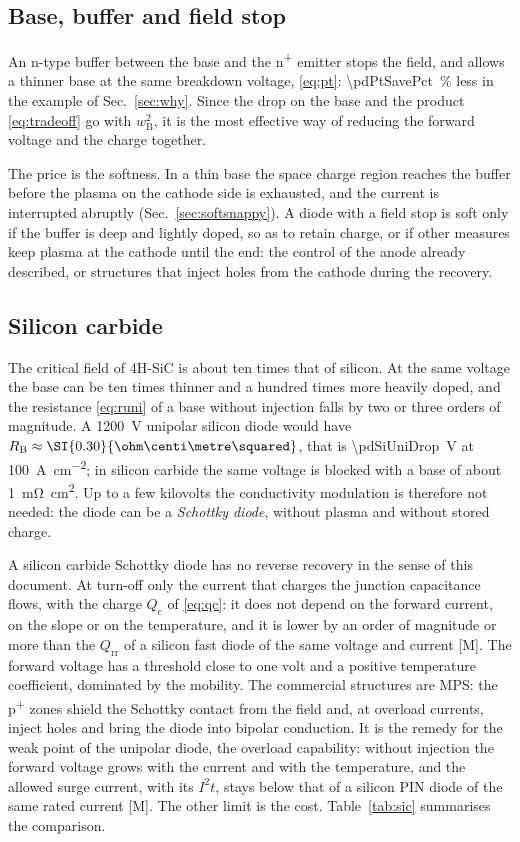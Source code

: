 \documentclass[10pt,a4paper]{scrartcl}
\newcommand{\Qrr}{Q_\mathrm{rr}}
\newcommand{\wB}{w_\mathrm{B}}
\newcommand{\Pp}{p\textsuperscript{+}}
\newcommand{\Np}{n\textsuperscript{+}}
\begin{document}
\subsection{Base, buffer and field stop}
\label{sec:buffer}
An n-type buffer between the base and the \Np{} emitter stops the field, and allows a thinner base at the same breakdown voltage, \eqref{eq:pt}: \SI{\pdPtSavePct}{\percent} less in the example of Sec.~\ref{sec:why}. Since the drop on the base and the product \eqref{eq:tradeoff} go with $\wB^2$, it is the most effective way of reducing the forward voltage and the charge together.

The price is the softness. In a thin base the space charge region reaches the buffer before the plasma on the cathode side is exhausted, and the current is interrupted abruptly (Sec.~\ref{sec:softsnappy}). A diode with a field stop is soft only if the buffer is deep and lightly doped, so as to retain charge, or if other measures keep plasma at the cathode until the end: the control of the anode already described, or structures that inject holes from the cathode during the recovery.

\subsection{Silicon carbide}
\label{sec:sic}
The critical field of 4H-SiC is about ten times that of silicon. At the same voltage the base can be ten times thinner and a hundred times more heavily doped, and the resistance \eqref{eq:runi} of a base without injection falls by two or three orders of magnitude. A \SI{1200}{\volt} unipolar silicon diode would have $R_\mathrm{B} \approx \SI{\pdSiUniR}{\ohm\centi\metre\squared}$, that is \SI{\pdSiUniDrop}{\volt} at \SI{100}{\ampere\per\centi\metre\squared}; in silicon carbide the same voltage is blocked with a base of about \SI{1}{\milli\ohm\centi\metre\squared}. Up to a few kilovolts the conductivity modulation is therefore not needed: the diode can be a \emph{Schottky diode}, without plasma and without stored charge.

A silicon carbide Schottky diode has no reverse recovery in the sense of this document. At turn-off only the current that charges the junction capacitance flows, with the charge $Q_\mathrm{c}$ of \eqref{eq:qc}: it does not depend on the forward current, on the slope or on the temperature, and it is lower by an order of magnitude or more than the $\Qrr$ of a silicon fast diode of the same voltage and current [M]. The forward voltage has a threshold close to one volt and a positive temperature coefficient, dominated by the mobility. The commercial structures are MPS: the \Pp{} zones shield the Schottky contact from the field and, at overload currents, inject holes and bring the diode into bipolar conduction. It is the remedy for the weak point of the unipolar diode, the overload capability: without injection the forward voltage grows with the current and with the temperature, and the allowed surge current, with its $I^2t$, stays below that of a silicon PIN diode of the same rated current [M]. The other limit is the cost. Table~\ref{tab:sic} summarises the comparison.
\end{document}
